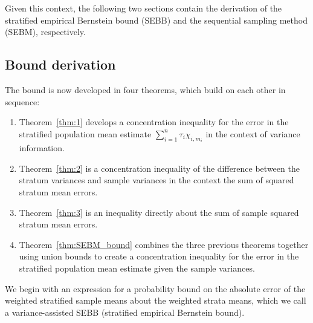 \documentclass[]{interact}
\theoremstyle{plain}%
\theoremstyle{definition}
\theoremstyle{remark}
\begin{document}
Given this context, the following two sections contain the derivation of the stratified empirical Bernstein bound (SEBB) 
and the sequential sampling method (SEBM), respectively. 



\subsection{Bound derivation}
The bound is now developed in four theorems, 
which build on each other in sequence:
\begin{enumerate}
    \item Theorem~\ref{thm:1} develops a concentration inequality for the error in the stratified population mean estimate $\sum_{i=1}^n\tau_i\chi_{i,m_i}$ in the context of variance information.
    \item Theorem~\ref{thm:2} is a concentration inequality of the difference between the stratum variances and sample variances in the context the sum of squared stratum mean errors.
    \item Theorem~\ref{thm:3} is an inequality directly about the sum of sample squared stratum mean errors.
    \item Theorem~\ref{thm:SEBM_bound} combines the three previous theorems together using union bounds to create a concentration inequality for the error in the stratified population mean estimate given the sample variances.
\end{enumerate}

We begin with an expression for a probability bound on the absolute error of the weighted stratified sample means about the weighted strata means, which we call a variance-assisted SEBB (stratified empirical Bernstein bound).
\end{document}
